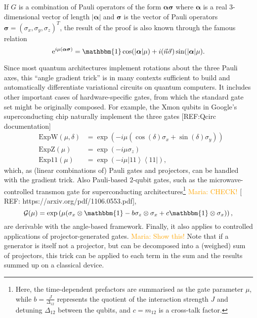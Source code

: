 \documentclass[aps,pra,10pt,twocolumn,groupedaddress,nofootinbib]{revtex4-1}
\theoremstyle{plain}
\newcommand{\ket}[1]{\ensuremath{\left| #1 \right \rangle}}
\newcommand{\bra}[1]{\ensuremath{\left \langle #1 \right |}}
\newcommand{\ketbra}[2]{\ket{#1}\bra{#2}}
\newcommand{\e}{\mathrm{e}}
\newcommand{\G}{\mathcal{G}}
\newcommand{\maria}[1]{\textcolor{orange}{Maria: #1}}
\begin{document}
If $G$ is a combination of Pauli operators of the form $\boldsymbol\alpha \boldsymbol\sigma$ where $\boldsymbol\alpha$ is a real $3$-dimensional vector of length $|\boldsymbol\alpha|$ and $\boldsymbol\sigma$ is the vector of Pauli operators $\boldsymbol\sigma = (\sigma_x, \sigma_y, \sigma_z)^T$, the result of the proof is also known through the famous relation
\[\e^{i \mu (\boldsymbol\alpha \boldsymbol\sigma)} = \mathbbm{1} \cos(|\boldsymbol\alpha| \mu) + i (\vec{n} \vec{\sigma}) \sin(|\boldsymbol\alpha| \mu).\] 


Since most quantum architectures implement rotations about the three Pauli axes, this ``angle gradient trick'' is in many contexts sufficient to build and automatically differentiate variational circuits on quantum computers. It includes other important cases of hardware-specific gates, from which the standard gate set might be originally composed. For example, the Xmon qubits in Google's superconducting chip naturally implement the three gates [REF:Qcirc documentation]
\begin{eqnarray*} 
&\text{ExpW}(\mu, \delta) &= \exp \left(- i \mu \left( \cos (\delta) \sigma_x + \sin(\delta)\sigma_y\right) \right)\\
&\text{ExpZ}(\mu) &= \exp \left(- i \mu \sigma_z \right)\\
&\text{Exp11}(\mu) &= \exp \left(- i \mu \ketbra{11}{11} \right), 
\end{eqnarray*}
which, as (linear combinations of) Pauli gates and projectors, can be handled with the gradient trick. Also Pauli-based $2$-qubit gates, such as the microwave-controlled transmon gate for superconducting architectures\footnote{Here, the time-dependent prefactors are summarised as the gate parameter $\mu$, while $b=\frac{J}{\Delta_{12}}$ represents the quotient of the interaction strength $J$ and detuning $\Delta_{12}$ between the qubits, and $c =m_{12}$ is a cross-talk factor.} \maria{CHECK!} [ REF: https://arxiv.org/pdf/1106.0553.pdf],
\begin{equation*}
\G(\mu) = \exp \left( \mu (\sigma_x \otimes \mathbbm{1} -  b \sigma_z \otimes \sigma_x + c \mathbbm{1} \otimes \sigma_x)  \right),
\end{equation*}
are derivable with the angle-based framework. Finally, it also applies to controlled applications of projector-generated gates. \maria{Show this!} Note that if a generator is itself not a projector, but can be decomposed into a (weighed) sum of projectors, this trick can be applied to each term in the sum and the results summed up on a classical device.
\end{document}
